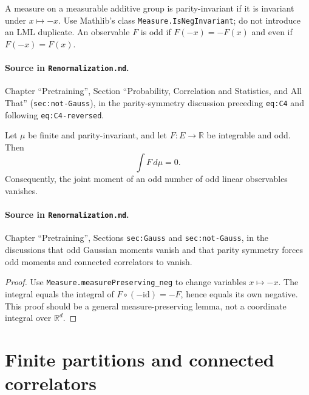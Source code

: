 \begin{definition}
\label{def:renorm:parity}
A measure on a measurable additive group is parity-invariant if it is invariant under $x\mapsto-x$.
Use Mathlib's class \texttt{Measure.IsNegInvariant}; do not introduce an LML duplicate.
An observable $F$ is odd if $F(-x)=-F(x)$ and even if $F(-x)=F(x)$.

\paragraph{Source in \texttt{Renormalization.md}.}
Chapter ``Pretraining'', Section ``Probability, Correlation and Statistics, and All That''
(\texttt{sec:not-Gauss}), in the parity-symmetry discussion preceding \texttt{eq:C4} and following
\texttt{eq:C4-reversed}.
\end{definition}

\begin{lemma}
\label{lem:renorm:oddIntegral}
Let $\mu$ be finite and parity-invariant, and let $F:E\to\mathbb R$ be integrable and odd.  Then
\[
  \int F\,d\mu=0.
\]
Consequently, the joint moment of an odd number of odd linear observables vanishes.

\paragraph{Source in \texttt{Renormalization.md}.}
Chapter ``Pretraining'', Sections \texttt{sec:Gauss} and \texttt{sec:not-Gauss}, in the discussions
that odd Gaussian moments vanish and that parity symmetry forces odd moments and connected
correlators to vanish.
\end{lemma}

\begin{proof}
Use \texttt{Measure.measurePreserving\_neg} to change variables $x\mapsto-x$.  The integral equals
the integral of $F\circ(-\mathrm{id})=-F$, hence equals its own negative.  This proof should be a
general measure-preserving lemma, not a coordinate integral over $\mathbb R^d$.
\end{proof}

\section{Finite partitions and connected correlators}

